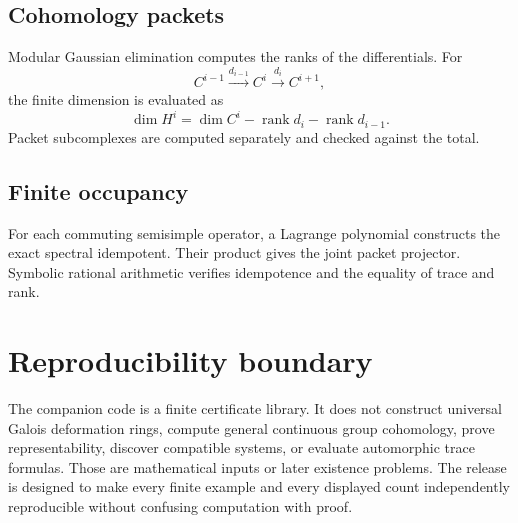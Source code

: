 \documentclass[11pt]{article}
\theoremstyle{definition}
\theoremstyle{remark}
\newcommand{\rank}{\operatorname{rank}}
\begin{document}
\subsection{Cohomology packets}

Modular Gaussian elimination computes the ranks of the differentials.  For
\[
C^{i-1}\xrightarrow{d_{i-1}}C^i\xrightarrow{d_i}C^{i+1},
\]
the finite dimension is evaluated as
\[
\dim H^i
=
\dim C^i-\rank d_i-\rank d_{i-1}.
\]
Packet subcomplexes are computed separately and checked against the total.

\subsection{Finite occupancy}

For each commuting semisimple operator, a Lagrange polynomial constructs the exact spectral idempotent.  Their product gives the joint packet projector.  Symbolic rational arithmetic verifies idempotence and the equality of trace and rank.

\section{Reproducibility boundary}

The companion code is a finite certificate library.  It does not construct universal Galois deformation rings, compute general continuous group cohomology, prove representability, discover compatible systems, or evaluate automorphic trace formulas.  Those are mathematical inputs or later existence problems.  The release is designed to make every finite example and every displayed count independently reproducible without confusing computation with proof.
\end{document}
